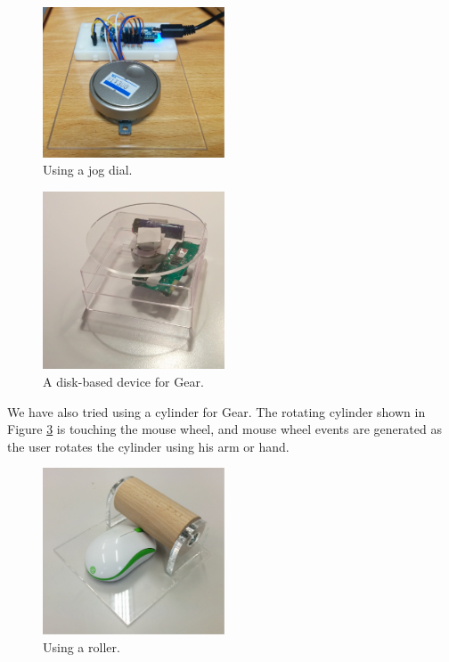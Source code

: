 \documentclass[conference]{IEEEtran}
\begin{document}
\begin{figure}[H]
\centerline{\includegraphics[width=54mm,bb=0 0 1324 1095]{figures/7a2c685b930cd30a267f4d564a8079be.png}}
\caption{Using a jog dial.}
\label{jog}
\end{figure}

\begin{figure}[H]
\centerline{\includegraphics[width=54mm,bb=0 0 362 354]{figures/ff2d18e66f9a4655dbb5e22e0bb9a0ae.png}}
\caption{A disk-based device for Gear.}
\label{disk}
\end{figure}

We have also tried using a cylinder for Gear.
The rotating cylinder shown in Figure \ref{roller} is touching the mouse wheel, and
mouse wheel events are generated as the user rotates the cylinder using his arm or hand.

\begin{figure}[H]
\centerline{\includegraphics[width=54mm,bb=0 0 1132 1039]{figures/6ff91502ea4f3f3c47840c887148ada9.png}}
\caption{Using a roller.}
\label{roller}
\end{figure}
\end{document}
